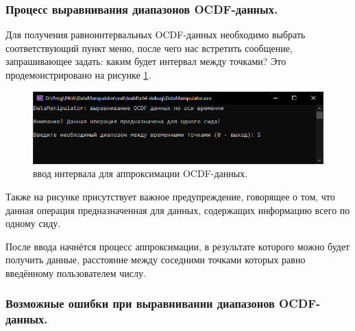 \subsubsection{ \standartTitleFont
  Процесс выравнивания диапазонов OCDF-данных.
} \label{subsubsec:OCDFRIProc}

{\standartFont

  \par Для получения равноинтервальных OCDF-данных необходимо выбрать соответствующий пункт меню, после чего нас встретить сообщение, запрашивающее задать: каким будет интервал между точками? Это продемонстрировано на рисунке \ref{fig:OCDFappr}.

  \begin{figure}[H]
    \centering
    \includegraphics[width=\textwidth]{images/forDataManipulator/OCDFrightIntervals.png}
    \caption{ввод интервала для аппроксимации OCDF-данных.} 
    \label{fig:OCDFappr}
  \end{figure}

  \par Также на рисунке присутствует важное предупреждение, говорящее о том, что данная операция предназначенная для данных, содержащих информацию всего по одному сиду.

  \par После ввода начнётся процесс аппроксимации, в результате которого можно будет получить данные, расстояние между соседними точками которых равно введённому пользователем числу.  

  \par 
}

\subsubsection{ \standartTitleFont
  Возможные ошибки при выравнивании диапазонов OCDF-данных.
} \label{subsubsec:OCDFRIErr}

